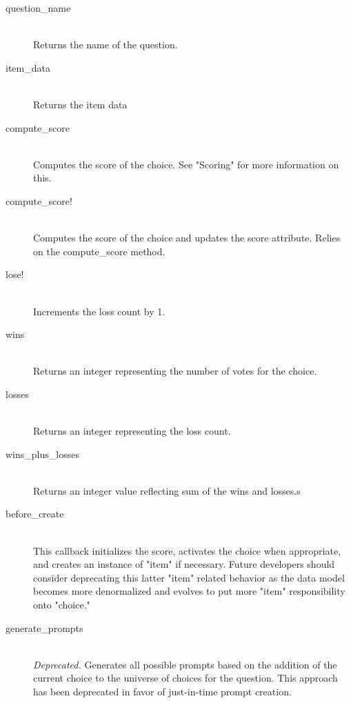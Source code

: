 \documentclass[11pt]{book}
\begin{document}
\begin{description}
	\item[question\_name]  \hfill \\
  Returns the name of the question.

  \item[item\_data]  \hfill \\
  \emph{}  Returns the item data
  
  \item[compute\_score]  \hfill \\
  \emph{}  Computes the score of the choice.  See "Scoring" for more information on this.
  
  \item[compute\_score!]  \hfill \\
  \emph{}  Computes the score of the choice and updates the score attribute.  Relies on the compute\_score method.
  
  \item[lose!]  \hfill \\
  \emph{}  Increments the loss count by 1.
  
  \item[wins]  \hfill \\
  \emph{}  Returns an integer representing the number of votes for the choice.
  
  \item[losses]  \hfill \\
  \emph{}  Returns an integer representing the loss count.
  
  \item[wins\_plus\_losses]  \hfill \\
  \emph{}  Returns an integer value reflecting sum of the wins and losses.s
  

  
	\item[before\_create]  \hfill \\
  This callback initializes the score, activates the choice when appropriate, and creates an instance of "item" if necessary.  Future developers should consider deprecating this latter "item" related behavior as the data model becomes more denormalized and evolves to put more "item" responsibility onto "choice."
  
  
	\item[generate\_prompts]  \hfill \\
  \emph{Deprecated.} Generates all possible prompts based on the addition of the current choice to the universe of choices for the question.  This approach has been deprecated in favor of just-in-time prompt creation.
 
 

  
\end{description}
\end{document}

